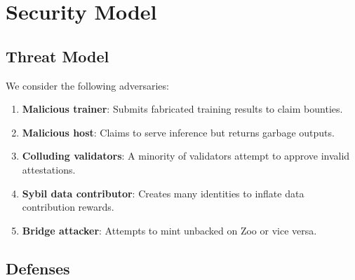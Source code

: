 \section{Security Model}
\label{sec:security}

\subsection{Threat Model}

We consider the following adversaries:

\begin{enumerate}
    \item \textbf{Malicious trainer}: Submits fabricated training results to claim bounties.
    \item \textbf{Malicious host}: Claims to serve inference but returns garbage outputs.
    \item \textbf{Colluding validators}: A minority of validators attempt to approve invalid attestations.
    \item \textbf{Sybil data contributor}: Creates many identities to inflate data contribution rewards.
    \item \textbf{Bridge attacker}: Attempts to mint unbacked \BLG{} on Zoo or vice versa.
\end{enumerate}

\subsection{Defenses}

